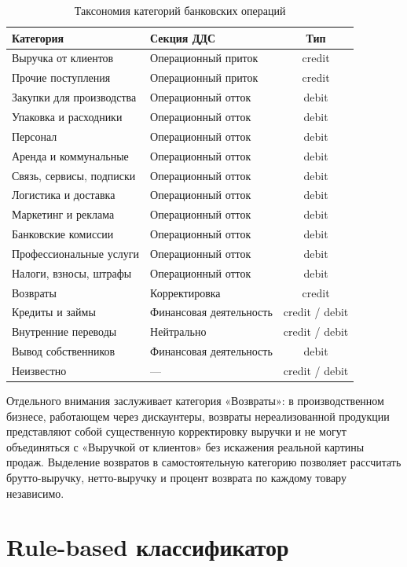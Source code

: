 \begin{table}[H]
\centering
\caption{Таксономия категорий банковских операций}
\label{tab:categories}
\begin{tabular}{llc}
\toprule
\textbf{Категория} & \textbf{Секция ДДС} & \textbf{Тип} \\
\midrule
Выручка от клиентов & Операционный приток & credit \\
Прочие поступления & Операционный приток & credit \\
Закупки для производства & Операционный отток & debit \\
Упаковка и расходники & Операционный отток & debit \\
Персонал & Операционный отток & debit \\
Аренда и коммунальные & Операционный отток & debit \\
Связь, сервисы, подписки & Операционный отток & debit \\
Логистика и доставка & Операционный отток & debit \\
Маркетинг и реклама & Операционный отток & debit \\
Банковские комиссии & Операционный отток & debit \\
Профессиональные услуги & Операционный отток & debit \\
Налоги, взносы, штрафы & Операционный отток & debit \\
Возвраты & Корректировка & credit \\
Кредиты и займы & Финансовая деятельность & credit / debit \\
Внутренние переводы & Нейтрально & credit / debit \\
Вывод собственников & Финансовая деятельность & debit \\
Неизвестно & --- & credit / debit \\
\bottomrule
\end{tabular}
\end{table}

Отдельного внимания заслуживает категория «Возвраты»: в производственном бизнесе, работающем через дискаунтеры, возвраты нереализованной продукции представляют собой существенную корректировку выручки и не могут объединяться с «Выручкой от клиентов» без искажения реальной картины продаж. Выделение возвратов в самостоятельную категорию позволяет рассчитать брутто-выручку, нетто-выручку и процент возврата по каждому товару независимо.

\section{Rule-based классификатор}


